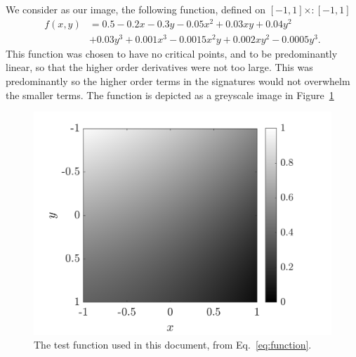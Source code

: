 \documentclass[review,onefignum,onetabnum]{siamonline190516}
\begin{document}
{We consider as our image, the following function, defined on $[-1, 1]
\times:
[-1, 1]$
\begin{equation}\label{eq:function}
  \begin{split}
    f(x, y) &= 0.5 - 0.2x - 0.3y - 0.05x^2 + 0.03xy + 0.04y^2 \\ 
    &+ 0.03y^3 + 0.001x^3 - 0.0015x^2y + 0.002xy^2 - 0.0005y^3.
  \end{split}
\end{equation}
This function was chosen to have no critical points, and to be
predominantly linear, so that the higher order derivatives were not too
large. This was predominantly so the higher order terms in the signatures
would not overwhelm the smaller terms. The function is depicted as a
greyscale image in Figure~\ref{fig:function}
\begin{figure}
  \centering
  \includegraphics[width=12cm]{Figs/function}
  \caption{The test function used in this document, from
  Eq.~\eqref{eq:function}.}\label{fig:function}
\end{figure}

}
\end{document}

